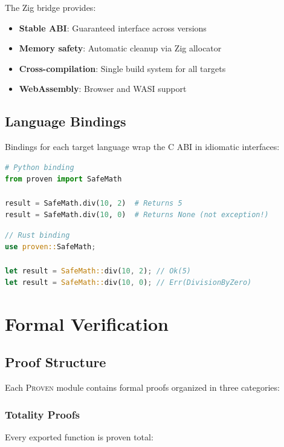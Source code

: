 \documentclass[11pt,a4paper]{article}
\newcommand{\proven}{\textsc{Proven}}
\begin{document}
The Zig bridge provides:

\begin{itemize}
    \item \textbf{Stable ABI}: Guaranteed interface across versions
    \item \textbf{Memory safety}: Automatic cleanup via Zig allocator
    \item \textbf{Cross-compilation}: Single build system for all targets
    \item \textbf{WebAssembly}: Browser and WASI support
\end{itemize}

\subsection{Language Bindings}

Bindings for each target language wrap the C ABI in idiomatic interfaces:

\begin{lstlisting}[language=Python]
# Python binding
from proven import SafeMath

result = SafeMath.div(10, 2)  # Returns 5
result = SafeMath.div(10, 0)  # Returns None (not exception!)
\end{lstlisting}

\begin{lstlisting}[language=Rust]
// Rust binding
use proven::SafeMath;

let result = SafeMath::div(10, 2); // Ok(5)
let result = SafeMath::div(10, 0); // Err(DivisionByZero)
\end{lstlisting}

\section{Formal Verification}

\subsection{Proof Structure}

Each \proven{} module contains formal proofs organized in three categories:

\subsubsection{Totality Proofs}

Every exported function is proven total:
\end{document}
